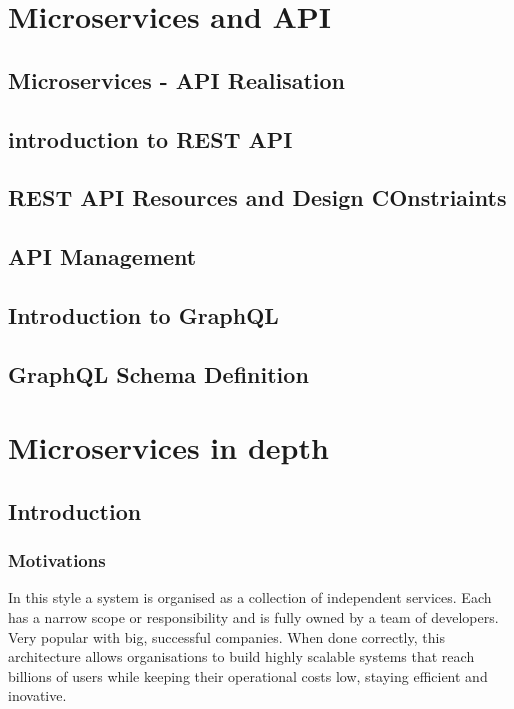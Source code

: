 \documentclass[a4paper, 11pt]{book}
\begin{document}
{    \chapter{Microservices and API}


    \section{Microservices - API Realisation}


    \section{introduction to REST API}


    \section{REST API Resources and Design COnstriaints}


    \section{API Management}


    \section{Introduction to GraphQL}


    \section{GraphQL Schema Definition}


    \chapter{Microservices in depth}


    \section{Introduction}

    \subsection{Motivations}
    In this style a system is organised as a collection of independent services.
    Each has a narrow scope or responsibility and is fully owned by a team of developers.
    Very popular with big, successful companies.
    When done correctly, this architecture allows organisations to build highly scalable systems that reach billions of users while keeping their operational costs low, staying efficient and inovative.

}
\end{document}
